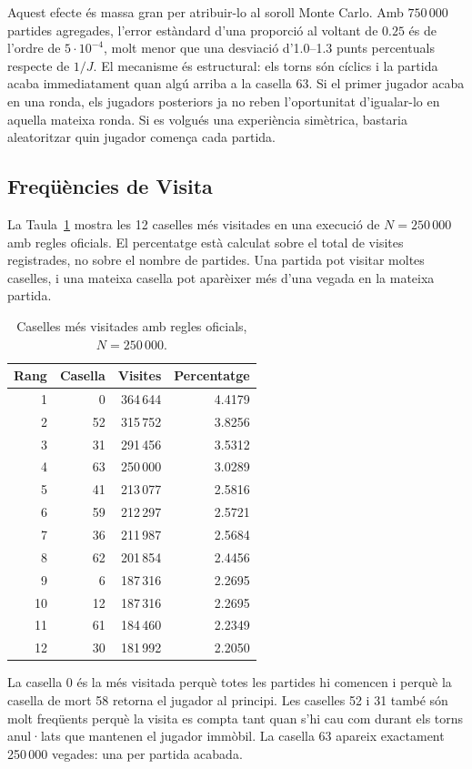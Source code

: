 \documentclass[conference,compsoc]{IEEEtran}
\begin{document}
Aquest efecte és massa gran per atribuir-lo al soroll Monte Carlo. Amb $750\,000$
partides agregades, l'error estàndard d'una proporció al voltant de $0.25$ és de
l'ordre de $5\cdot10^{-4}$, molt menor que una desviació d'1.0--1.3 punts
percentuals respecte de $1/J$. El mecanisme és estructural: els torns són cíclics i
la partida acaba immediatament quan algú arriba a la casella 63. Si el primer
jugador acaba en una ronda, els jugadors posteriors ja no reben l'oportunitat
d'igualar-lo en aquella mateixa ronda. Si es volgués una experiència simètrica,
bastaria aleatoritzar quin jugador comença cada partida.

\subsection{Freqüències de Visita}

La Taula~\ref{tab:visites} mostra les 12 caselles més visitades en una execució de
$N=250\,000$ amb regles oficials. El percentatge està calculat sobre el total de
visites registrades, no sobre el nombre de partides. Una partida pot visitar moltes
caselles, i una mateixa casella pot aparèixer més d'una vegada en la mateixa
partida.

\begin{table}[H]
\centering
\caption{Caselles més visitades amb regles oficials, $N=250\,000$.}
\label{tab:visites}
\footnotesize
\begin{tabular}{rrrr}
\toprule
Rang & Casella & Visites & Percentatge \\
\midrule
1 & 0 & 364\,644 & 4.4179 \\
2 & 52 & 315\,752 & 3.8256 \\
3 & 31 & 291\,456 & 3.5312 \\
4 & 63 & 250\,000 & 3.0289 \\
5 & 41 & 213\,077 & 2.5816 \\
6 & 59 & 212\,297 & 2.5721 \\
7 & 36 & 211\,987 & 2.5684 \\
8 & 62 & 201\,854 & 2.4456 \\
9 & 6 & 187\,316 & 2.2695 \\
10 & 12 & 187\,316 & 2.2695 \\
11 & 61 & 184\,460 & 2.2349 \\
12 & 30 & 181\,992 & 2.2050 \\
\bottomrule
\end{tabular}
\end{table}

La casella 0 és la més visitada perquè totes les partides hi comencen i perquè la
casella de mort 58 retorna el jugador al principi. Les caselles 52 i 31 també són
molt freqüents perquè la visita es compta tant quan s'hi cau com durant els torns
anul·lats que mantenen el jugador immòbil. La casella 63 apareix exactament
250\,000 vegades: una per partida acabada.
\end{document}
